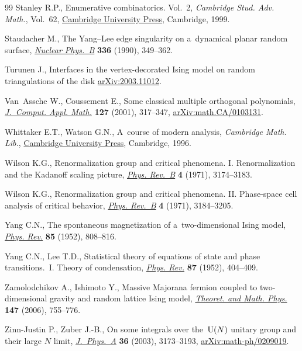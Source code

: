 \documentclass[pdftex]{sigma}
\numberwithin{equation}{section}
\begin{document}
\begin{thebibliography}{99}
Stanley R.P., Enumerative combinatorics. {V}ol.~2, \textit{Cambridge Stud. Adv.
 Math.}, Vol.~62, \href{https://doi.org/10.1017/CBO9780511609589}{Cambridge
 University Press}, Cambridge, 1999.

Staudacher M., The {Y}ang--{L}ee edge singularity on a~dynamical planar random
 surface, \href{https://doi.org/10.1016/0550-3213(90)90432-D}{\textit{Nuclear
 Phys.~B}} \textbf{336} (1990), 349--362.

Turunen J., Interfaces in the vertex-decorated Ising model on random
 triangulations of the disk
 \href{http://arxiv.org/abs/2003.11012}{arXiv:2003.11012}.

Van~Assche W., Coussement E., Some classical multiple orthogonal polynomials,
 \href{https://doi.org/10.1016/S0377-0427(00)00503-3}{\textit{J.~Comput. Appl.
 Math.}} \textbf{127} (2001), 317--347,
 \href{http://arxiv.org/abs/math.CA/0103131}{arXiv:math.CA/0103131}.

Whittaker E.T., Watson G.N., A~course of modern analysis, \textit{Cambridge Math. Lib.},
 \href{https://doi.org/10.1017/CBO9780511608759}{Cambridge University Press},
 Cambridge, 1996.

Wilson K.G., Renormalization group and critical phenomena. {I}.
 {R}enormalization and the {K}adanoff scaling picture,
 \href{https://doi.org/10.1103/PhysRevB.4.3174}{\textit{Phys. Rev.~B}}
 \textbf{4} (1971), 3174--3183.

Wilson K.G., Renormalization group and critical phenomena. {II}. Phase-space
 cell analysis of critical behavior,
 \href{https://doi.org/10.1103/PhysRevB.4.3184}{\textit{Phys. Rev.~B}}
 \textbf{4} (1971), 3184--3205.

Yang C.N., The spontaneous magnetization of a~two-dimensional {I}sing model,
 \href{https://doi.org/10.1103/PhysRev.85.808}{\textit{Phys. Rev.}}
 \textbf{85} (1952), 808--816.

Yang C.N., Lee T.D., Statistical theory of equations of state and phase
 transitions.~{I}. {T}heory of condensation,
 \href{https://doi.org/10.1103/PhysRev.87.404}{\textit{Phys. Rev.}}
 \textbf{87} (1952), 404--409.

Zamolodchikov A., Ishimoto Y., Massive {M}ajorana fermion coupled to
 two-dimensional gravity and random lattice {I}sing model,
 \href{https://doi.org/10.1007/s11232-006-0076-7}{\textit{Theoret. and Math.
 Phys.}} \textbf{147} (2006), 755--776.

Zinn-Justin P., Zuber J.-B., On some integrals over the~{${\rm U}(N)$} unitary
 group and their large {$N$} limit,
 \href{https://doi.org/10.1088/0305-4470/36/12/318}{\textit{J.~Phys.~A}}
 \textbf{36} (2003), 3173--3193,
 \href{http://arxiv.org/abs/math-ph/0209019}{arXiv:math-ph/0209019}.

\end{thebibliography}\LastPageEnding
\end{document}

